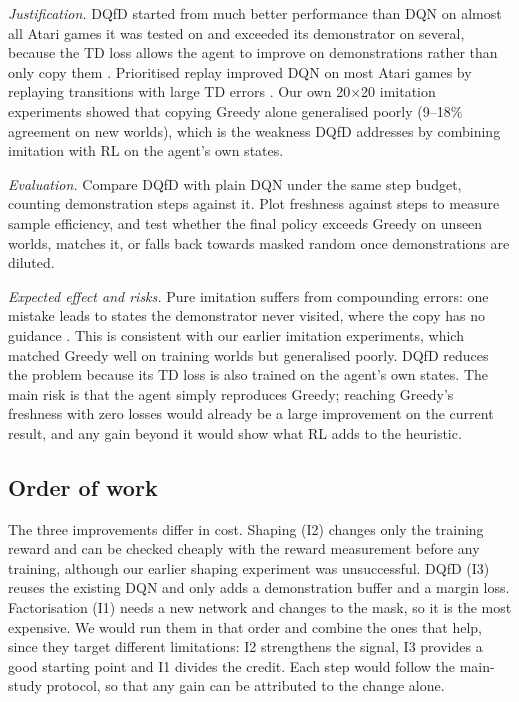 \emph{Justification.} DQfD started from much better performance than DQN on almost all Atari
games it was tested on and exceeded its demonstrator on several, because the TD loss allows the agent to improve on demonstrations
rather than only copy them \cite{hester2018}. Prioritised replay improved DQN on most Atari
games by replaying transitions with large TD errors \cite{schaul2016}. Our own 20$\times$20
imitation experiments showed that copying Greedy alone generalised poorly (9--18\% agreement on
new worlds), which is the weakness DQfD addresses by combining imitation with RL on the
agent's own states.

\emph{Evaluation.} Compare DQfD with plain DQN under the same step budget, counting
demonstration steps against it. Plot freshness against steps to measure sample efficiency, and
test whether the final policy exceeds Greedy on unseen worlds, matches it, or falls back
towards masked random once demonstrations are diluted.

\emph{Expected effect and risks.} Pure imitation suffers from compounding errors: one mistake
leads to states the demonstrator never visited, where the copy has no guidance
\cite{ross2011}. This is consistent with our earlier imitation experiments, which matched
Greedy well on training worlds but generalised poorly. DQfD reduces the problem because its TD loss is also trained on
the agent's own states. The main risk is that the agent simply reproduces Greedy; reaching
Greedy's freshness with zero losses would already be a large improvement on the current
result, and any gain beyond it would show what RL adds to the heuristic.

\subsection{Order of work}

The three improvements differ in cost. Shaping (I2) changes only the training
reward and can be checked cheaply with the reward measurement before any training, although
our earlier shaping experiment was unsuccessful. DQfD (I3)
reuses the existing DQN and only adds a demonstration buffer and a margin loss. Factorisation
(I1) needs a new network and changes to the mask, so it is the most expensive. We would run
them in that order and combine the ones that help, since they target different limitations:
I2 strengthens the signal, I3 provides a good starting point and I1 divides the credit.
Each step would follow the main-study protocol, so that any gain can be attributed to the
change alone.

